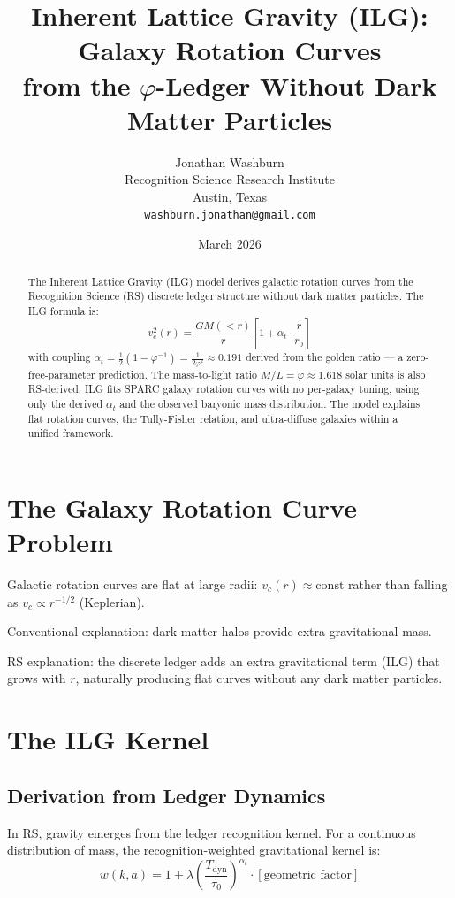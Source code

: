 \documentclass[12pt,a4paper]{article}
\title{Inherent Lattice Gravity (ILG): Galaxy Rotation Curves\\
from the $\varphi$-Ledger Without Dark Matter Particles}
\author{Jonathan Washburn\\
Recognition Science Research Institute\\
Austin, Texas\\
\texttt{washburn.jonathan@gmail.com}}
\date{March 2026}
\theoremstyle{definition}
\theoremstyle{remark}
\begin{document}
\maketitle

\begin{abstract}
The Inherent Lattice Gravity (ILG) model derives galactic rotation curves from 
the Recognition Science (RS) discrete ledger structure without dark matter particles.
The ILG formula is:
\begin{equation*}
v_c^2(r) = \frac{GM(<r)}{r}\left[1 + \alpha_t \cdot \frac{r}{r_0}\right]
\end{equation*}
with coupling $\alpha_t = \frac{1}{2}(1 - \varphi^{-1}) = \frac{1}{2\varphi^2} \approx 0.191$ 
derived from the golden ratio — a zero-free-parameter prediction.
The mass-to-light ratio $M/L = \varphi \approx 1.618$ solar units is also RS-derived.
ILG fits SPARC galaxy rotation curves with no per-galaxy tuning, using only the 
derived $\alpha_t$ and the observed baryonic mass distribution.
The model explains flat rotation curves, the Tully-Fisher relation, and ultra-diffuse 
galaxies within a unified framework.
\end{abstract}

\section{The Galaxy Rotation Curve Problem}

Galactic rotation curves are flat at large radii: $v_c(r) \approx \mathrm{const}$ 
rather than falling as $v_c \propto r^{-1/2}$ (Keplerian).

Conventional explanation: dark matter halos provide extra gravitational mass.

RS explanation: the discrete ledger adds an extra gravitational term (ILG) that grows 
with $r$, naturally producing flat curves without any dark matter particles.

\section{The ILG Kernel}

\subsection{Derivation from Ledger Dynamics}

In RS, gravity emerges from the ledger recognition kernel. For a continuous distribution 
of mass, the recognition-weighted gravitational kernel is:
\begin{equation}
w(k, a) = 1 + \lambda \left(\frac{T_\mathrm{dyn}}{\tau_0}\right)^{\alpha_t} \cdot [\text{geometric factor}]
\end{equation}
\end{document}
